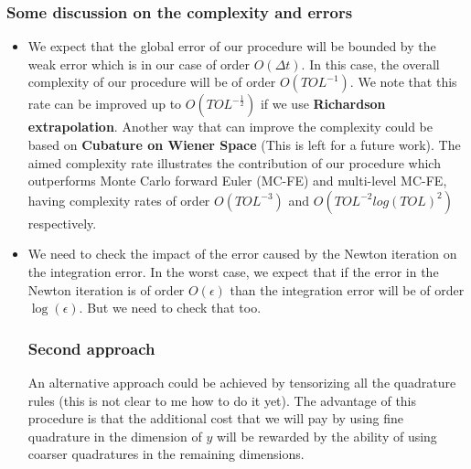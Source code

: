 \documentclass[11pt]{article}
\begin{document}
\subsubsection{Some discussion on the complexity and errors}
\begin{itemize}
	\item We expect that the global error of our procedure will be bounded by the weak error which is in our case of order $O(\Delta t)$. In this case, the overall complexity of our procedure will be of order $O(TOL^{-1})$. We note that this rate can be improved up to $O(TOL^{-\frac{1}{2}})$ if we use \textbf{Richardson extrapolation}. Another way that can improve the complexity could be based on \textbf{Cubature on Wiener Space} (This is left for a future work). The aimed complexity rate illustrates the contribution of our procedure which outperforms  Monte Carlo forward Euler (MC-FE) and multi-level MC-FE, having complexity rates of order $O(TOL^{-3})$  and $O(TOL^{-2} log(TOL)^2)$  respectively. 
	\item We need to check the impact of the error caused by the Newton iteration on the integration error. In the worst case, we expect that if the error in the Newton iteration is of order $O(\epsilon)$ than the integration error will be of order $\operatorname{log}(\epsilon)$. But we need to check that too.
\subsubsection{Second approach}
An alternative approach could be achieved by tensorizing all the quadrature rules (this is not clear to me how to do it yet). The advantage of this procedure is that the additional cost that we will pay by using fine quadrature in the dimension of $y$ will be rewarded by the ability of using coarser quadratures in the remaining dimensions.
\end{itemize}
\end{document}
